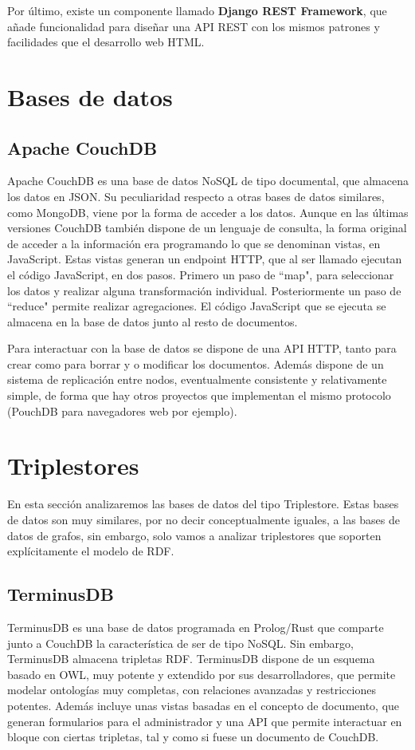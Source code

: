 \documentclass[12pt]{report} %
\begin{document}
Por último, existe un componente llamado \textbf{Django REST Framework}, que añade funcionalidad para diseñar una API REST con los mismos patrones y facilidades que el desarrollo web HTML.

\section{Bases de datos}
\subsection{Apache CouchDB}
Apache CouchDB es una base de datos NoSQL de tipo documental, que almacena los datos en JSON.\cite{couchdb}
Su peculiaridad respecto a otras bases de datos similares, como MongoDB, viene por la forma de acceder a los datos.
Aunque en las últimas versiones CouchDB también dispone de un lenguaje de consulta, la forma original de acceder a la información era programando lo que se denominan vistas, en JavaScript.
Estas vistas generan un endpoint HTTP, que al ser llamado ejecutan el código JavaScript, en dos pasos. Primero un paso de ``map", para seleccionar los datos y realizar alguna transformación individual.
Posteriormente un paso de ``reduce" permite realizar agregaciones. El código JavaScript que se ejecuta se almacena en la base de datos junto al resto de documentos.

Para interactuar con la base de datos se dispone de una API HTTP, tanto para crear como para borrar y o modificar los documentos.
Además dispone de un sistema de replicación entre nodos, eventualmente consistente y relativamente simple, de forma que hay otros proyectos que implementan el mismo protocolo (PouchDB para navegadores web por ejemplo).

\section{Triplestores}

En esta sección analizaremos las bases de datos del tipo Triplestore. Estas bases de datos son muy similares, por no decir conceptualmente iguales, a las bases de datos de grafos, sin embargo, solo vamos a analizar triplestores que soporten explícitamente el modelo de RDF.

\subsection{TerminusDB}
TerminusDB es una base de datos programada en Prolog/Rust que comparte junto a CouchDB la característica de ser de tipo NoSQL.\cite{terminusdb}
Sin embargo, TerminusDB almacena tripletas RDF.
TerminusDB dispone de un esquema basado en OWL, muy potente y extendido por sus desarrolladores, que permite modelar ontologías muy completas, con relaciones avanzadas y restricciones potentes. Además incluye unas vistas basadas en el concepto de documento, que generan formularios para el administrador y una API que permite interactuar en bloque con ciertas tripletas, tal y como si fuese un documento de CouchDB.
\end{document}
